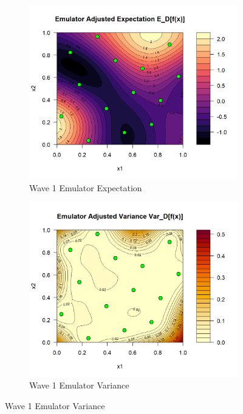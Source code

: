 \documentclass[12pt]{report} %
\begin{document}
\begin{figure}[H]
    \centering
    \begin{subfigure}[b]{0.49\textwidth}
        \centering
        \includegraphics[width=\textwidth]{Wave 1 Emulator Expectation.png}
        \caption{Wave 1 Emulator Expectation}
        \label{fig:Wave 1 Emulator Expectation}
    \end{subfigure}
    \hfill
    \begin{subfigure}[b]{0.49\textwidth}
        \centering
        \includegraphics[width=\textwidth]{Wave 1 Emulator Variance.png}
        \caption{Wave 1 Emulator Variance}
        \label{fig:Wave 1 Emulator Variance}
    \end{subfigure}


\end{figure}
\end{document}

